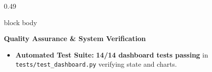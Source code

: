 \documentclass[aspectratio=169, 10pt]{beamer}
\newenvironment{card}[1][]{%
        \begin{beamercolorbox}[rounded=true,shadow=false,wd=\linewidth,sep=3.5pt,#1]{block body}%
        \fontsize{7.8pt}{9.8pt}\selectfont%
    }{%
        \end{beamercolorbox}%
    }
\begin{document}
\begin{frame}[t]
\begin{columns}[T]
\begin{column}{0.49\textwidth}
                \begin{card}                                                                                                                                                                           
                    \textbf{\color{GreenAccent}Quality Assurance \& System Verification}\\[0.03cm]                                                                                                     
                    \begin{itemize}\setlength{\itemsep}{1.2pt}                                                                                                                                         
                        \item \textbf{Automated Test Suite:} \textbf{14/14 dashboard tests passing} in \texttt{tests/test\_dashboard.py} verifying state and charts.                                                                 
                    \end{itemize}                                                                                                                                                                      
                \end{card}                                                                                                                                                                             
            \end{column}                                                                                                                                                                               
        \end{columns}                                                                                                                                                                                  
    \end{frame}                                                                                                                                                                                        
                                                                                                                                                                                                       
\end{document}
